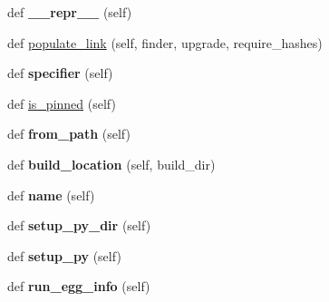 \begin{DoxyCompactItemize}
def {\bfseries \+\_\+\+\_\+repr\+\_\+\+\_\+} (self)
\item 
def \hyperlink{classpip_1_1req_1_1req__install_1_1_install_requirement_ac4dd98a7072a2d64cb9271e140e0e167}{populate\+\_\+link} (self, finder, upgrade, require\+\_\+hashes)
\item 
\mbox{\label{classpip_1_1req_1_1req__install_1_1_install_requirement_a07edfab9a94d89440965810472da730c}} 
def {\bfseries specifier} (self)
\item 
def \hyperlink{classpip_1_1req_1_1req__install_1_1_install_requirement_ad27ff0b16cd59e0336bb56e7c7b0137e}{is\+\_\+pinned} (self)
\item 
\mbox{\label{classpip_1_1req_1_1req__install_1_1_install_requirement_a8d060544af0a9d3fbb0111337106901d}} 
def {\bfseries from\+\_\+path} (self)
\item 
\mbox{\label{classpip_1_1req_1_1req__install_1_1_install_requirement_a6589aa505caa41f139afd0a78e5fa3ac}} 
def {\bfseries build\+\_\+location} (self, build\+\_\+dir)
\item 
\mbox{\label{classpip_1_1req_1_1req__install_1_1_install_requirement_a3ec3392ff744c971bd99a85c2a9e202c}} 
def {\bfseries name} (self)
\item 
\mbox{\label{classpip_1_1req_1_1req__install_1_1_install_requirement_aaf1495f8c0170c9cf3ec8be4ed1ccd9e}} 
def {\bfseries setup\+\_\+py\+\_\+dir} (self)
\item 
\mbox{\label{classpip_1_1req_1_1req__install_1_1_install_requirement_a08326b104c5c8647c1da5ffd3d324aa9}} 
def {\bfseries setup\+\_\+py} (self)
\item 
\mbox{\label{classpip_1_1req_1_1req__install_1_1_install_requirement_af448e5cf99e88e3f5238e23108ed7e96}} 
def {\bfseries run\+\_\+egg\+\_\+info} (self)
\item 
\mbox{\label{classpip_1_1req_1_1req__install_1_1_install_requirement_a01c3846da0f68944e51091dcbc67009d}} 

\end{DoxyCompactItemize}
